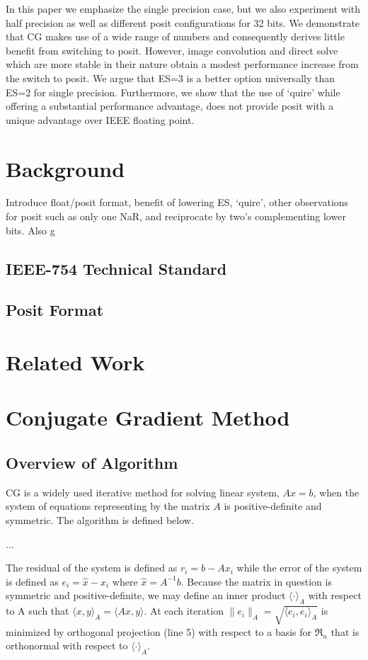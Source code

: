 \documentclass[conference]{IEEEtran}
\begin{document}
In this paper we emphasize the single precision case, but we also experiment with half precision as well as different posit configurations for 32 bits. We demonstrate that CG makes use of a wide range of numbers and consequently derives little benefit from switching to posit. However, image convolution and direct solve which are more stable in their nature obtain a modest performance increase from the switch to posit. We argue that ES=3 is a better option universally than ES=2 for single precision. Furthermore, we show that the use of ‘quire’ while offering a substantial performance advantage, does not provide posit with a unique advantage over IEEE floating point. 
\section{Background}

Introduce float/posit format, benefit of lowering ES, ‘quire’, other observations for posit such as only one NaR, and reciprocate by two’s complementing lower bits. Also g

\subsection{IEEE-754 Technical Standard}

\subsection{Posit Format}

\section{Related Work}

\section{Conjugate Gradient Method}

\subsection{Overview of Algorithm}
CG is a widely used iterative method for solving linear system, $Ax = b$, when the system of equations representing by the matrix $A$ is positive-definite and symmetric. The algorithm is defined below. 

...


The residual of the system is defined as $r_{i} = b - Ax_{i}$  while the error of the system is defined as $e_{i} = \hat{x} - x_{i}$ where $\hat{x} = A^{-1}b$. Because the matrix in question is symmetric and positive-definite, we may define an inner product $\langle \cdot \rangle_{A}$ with respect to A such that $\langle x, y \rangle_{A} = \langle Ax, y \rangle$. At each iteration $\|e_{i}\|_{A} = \sqrt{\langle e_{i}, e_{i} \rangle_{A}}$ is minimized by orthogonal projection (line 5) with respect to a basis for $\Re_{n}$ that is orthonormal with respect to $\langle \cdot \rangle_{A}$.
\end{document}
